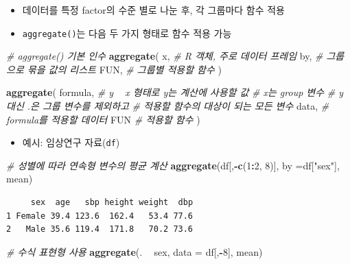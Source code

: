 \documentclass[
  11pt,
]{krantz}
\newenvironment{Shaded}{\begin{snugshade}}{\end{snugshade}}
\newcommand{\CommentTok}[1]{\textcolor[rgb]{0.37,0.37,0.37}{\textit{#1}}}
\newcommand{\DataTypeTok}[1]{\textcolor[rgb]{0.27,0.27,0.27}{#1}}
\newcommand{\DecValTok}[1]{\textcolor[rgb]{0.06,0.06,0.06}{#1}}
\newcommand{\KeywordTok}[1]{\textcolor[rgb]{0.27,0.27,0.27}{\textbf{#1}}}
\newcommand{\NormalTok}[1]{#1}
\newcommand{\OperatorTok}[1]{\textcolor[rgb]{0.43,0.43,0.43}{\textbf{#1}}}
\newcommand{\StringTok}[1]{\textcolor[rgb]{0.5,0.5,0.5}{#1}}
\providecommand{\tightlist}{%
  \setlength{\itemsep}{0pt}\setlength{\parskip}{0pt}}
\begin{document}
\begin{itemize}
\tightlist
\item
  데이터를 특정 factor의 수준 별로 나눈 후, 각 그룹마다 함수 적용
\item
  \texttt{aggregate()}는 다음 두 가지 형태로 함수 적용 가능
\end{itemize}

\footnotesize

\begin{Shaded}
\begin{Highlighting}[]
\CommentTok{# aggregate() 기본 인수}
\KeywordTok{aggregate}\NormalTok{(}
\NormalTok{  x, }\CommentTok{# R 객체, 주로 데이터 프레임}
\NormalTok{  by, }\CommentTok{# 그룹으로 묶을 값의 리스트}
\NormalTok{  FUN, }\CommentTok{# 그룹별 적용할 함수}
\NormalTok{)}

\KeywordTok{aggregate}\NormalTok{(}
\NormalTok{  formula, }\CommentTok{# y ~ x 형태로 y는 계산에 사용할 값}
           \CommentTok{# x는 group 변수}
           \CommentTok{# y 대신 .은 그룹 변수를 제외하고 }
           \CommentTok{# 적용할 함수의 대상이 되는 모든 변수}
\NormalTok{  data, }\CommentTok{# formula를 적용할 데이터}
\NormalTok{  FUN }\CommentTok{# 적용할 함수}
\NormalTok{)}
\end{Highlighting}
\end{Shaded}

\normalsize

\begin{itemize}
\tightlist
\item
  예시: 임상연구 자료(\texttt{df})
\end{itemize}

\footnotesize

\begin{Shaded}
\begin{Highlighting}[]
\CommentTok{# 성별에 따라 연속형 변수의 평균 계산}
\KeywordTok{aggregate}\NormalTok{(df[,}\OperatorTok{-}\KeywordTok{c}\NormalTok{(}\DecValTok{1}\OperatorTok{:}\DecValTok{2}\NormalTok{, }\DecValTok{8}\NormalTok{)], }\DataTypeTok{by =}\NormalTok{df[}\StringTok{"sex"}\NormalTok{], mean)}
\end{Highlighting}
\end{Shaded}

\begin{verbatim}
     sex  age   sbp height weight  dbp
1 Female 39.4 123.6  162.4   53.4 77.6
2   Male 35.6 119.4  171.8   70.2 73.6
\end{verbatim}

\begin{Shaded}
\begin{Highlighting}[]
\CommentTok{# 수식 표현형 사용}
\KeywordTok{aggregate}\NormalTok{(. }\OperatorTok{~}\StringTok{ }\NormalTok{sex, }
          \DataTypeTok{data =}\NormalTok{ df[,}\OperatorTok{-}\DecValTok{8}\NormalTok{], }
\NormalTok{          mean)}
\end{Highlighting}
\end{Shaded}
\end{document}

